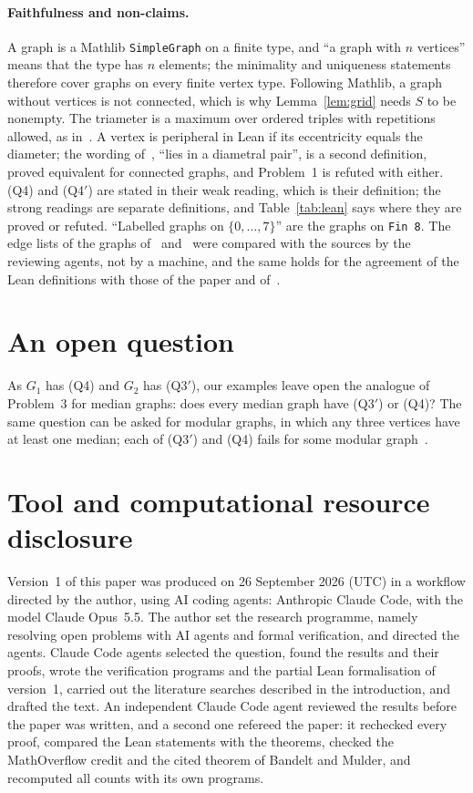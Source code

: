 \documentclass[11pt]{article}
\theoremstyle{remark}
\newcommand{\QAp}{\textup{(Q3$'$)}}
\newcommand{\QB}{\textup{(Q4)}}
\newcommand{\QBp}{\textup{(Q4$'$)}}
\begin{document}
\paragraph{Faithfulness and non-claims.}
A graph is a Mathlib \texttt{SimpleGraph} on a finite type, and ``a graph
with $n$ vertices'' means that the type has $n$ elements; the minimality and
uniqueness statements therefore cover graphs on every finite vertex type.
Following Mathlib, a graph without vertices is not connected, which is why
Lemma~\ref{lem:grid} needs $S$ to be nonempty. The triameter is a maximum
over ordered triples with repetitions allowed, as in~\cite{hko}. A vertex
is peripheral in Lean if its eccentricity equals the diameter; the wording
of~\cite{hko}, ``lies in a diametral pair'', is a second definition, proved
equivalent for connected graphs, and Problem~1 is refuted with either. \QB{} and
\QBp{} are stated in their weak reading, which is their definition; the
strong readings are separate definitions, and Table~\ref{tab:lean} says
where they are proved or refuted. ``Labelled graphs on $\{0,\dots,7\}$'' are
the graphs on \texttt{Fin 8}. The edge lists of the graphs of~\cite{hko}
and~\cite{mo-a} were compared with the sources by the reviewing agents, not
by a machine, and the same holds for the agreement of the Lean definitions
with those of the paper and of~\cite{hko}.

\section{An open question}\label{sec:open}
As $G_1$ has \QB{} and $G_2$ has \QAp, our examples leave open the analogue of
Problem~3 for median graphs: does every median graph have \QAp{} or \QB? The
same question can be asked for modular graphs, in which any three vertices have
at least one median; each of \QAp{} and \QB{} fails for some modular
graph~\cite[Section~4]{hko}.

\section*{Tool and computational resource disclosure}
Version~1 of this paper was produced on 26 September 2026 (UTC) in a
workflow directed by the author, using AI coding agents: Anthropic Claude
Code, with the model Claude Opus~5.5. The author set the research programme,
namely resolving open problems with AI agents and formal verification, and
directed the agents. Claude Code agents selected the question, found the
results and their proofs, wrote the verification programs and the partial
Lean formalisation of version~1, carried out the literature searches
described in the introduction, and drafted the text. An independent Claude
Code agent reviewed the results before the paper was written, and a second
one refereed the paper: it rechecked every proof, compared the Lean
statements with the theorems, checked the MathOverflow credit and the cited
theorem of Bandelt and Mulder, and recomputed all counts with its own
programs.
\end{document}
